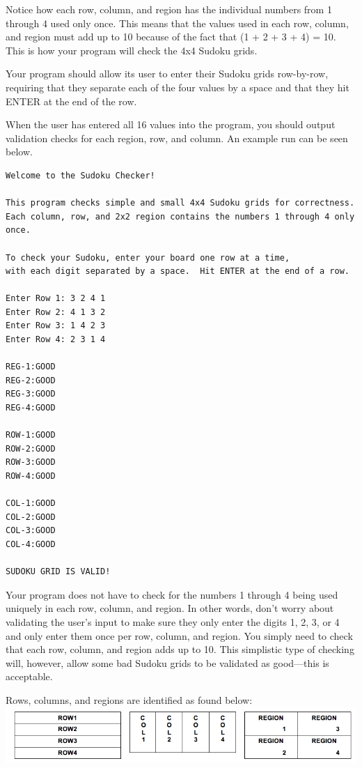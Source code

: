 \noindent Notice how each row, column, and region has the individual numbers from 1 through 4 used only once.  This means
that the values used in each row, column, and region must add up to 10 because of the fact that (1 + 2 + 3 + 4) = 10.  This is
how your program will check the 4x4 Sudoku grids.

\noindent Your program should allow its user to enter their Sudoku grids row-by-row, requiring that they separate each
of the four values by a space and that they hit ENTER at the end of the row.

\noindent When the user has entered all 16 values into the program, you should output validation checks for each region,
row, and column.  An example run can be seen below.

\begin{verbatim}
Welcome to the Sudoku Checker!

This program checks simple and small 4x4 Sudoku grids for correctness. 
Each column, row, and 2x2 region contains the numbers 1 through 4 only once.

To check your Sudoku, enter your board one row at a time, 
with each digit separated by a space.  Hit ENTER at the end of a row.

Enter Row 1: 3 2 4 1
Enter Row 2: 4 1 3 2
Enter Row 3: 1 4 2 3
Enter Row 4: 2 3 1 4

REG-1:GOOD
REG-2:GOOD
REG-3:GOOD
REG-4:GOOD

ROW-1:GOOD
ROW-2:GOOD
ROW-3:GOOD
ROW-4:GOOD

COL-1:GOOD
COL-2:GOOD
COL-3:GOOD
COL-4:GOOD

SUDOKU GRID IS VALID!
\end{verbatim}

\newpage

\noindent Your program does not have to check for the numbers 1 through 4 being used uniquely in each row, column, and
region.  In other words, don't worry about validating the user's input to make sure they only enter the digits 1, 2, 3,
or 4 and only enter them once per row, column, and region.  You simply need to check that each row, column, and region
adds up to 10. This simplistic type of checking will, however, allow some bad Sudoku grids to be validated as
good---this is acceptable. 

\noindent Rows, columns, and regions are identified as found below:\\

\vspace*{.01in}
\includegraphics[scale=0.5]{sud}

